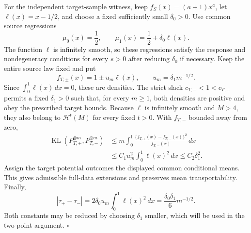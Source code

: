For the independent target-sample witness, keep \(f_S(x)=(a+1)x^a\), let \(\ell(x)=x-1/2\), and choose a fixed sufficiently small \(\delta_0>0\). Use common source regressions
\[
\mu_0(x)=\frac12,
\qquad
\mu_1(x)=\frac12+\delta_0\ell(x).
\]
The function \(\ell\) is infinitely smooth, so these regressions satisfy the response and nondegeneracy conditions for every \(s>0\) after reducing \(\delta_0\) if necessary. Keep the entire source law fixed and put
\[
f_{T,\pm}(x)=1\pm u_m\ell(x),
\qquad
u_m=\delta_1m^{-1/2}.
\]
Since \(\int_0^1\ell(x)\,dx=0\), these are densities. The strict slack \(c_{T,-}<1<c_{T,+}\) permits a fixed \(\delta_1>0\) such that, for every \(m\ge1\), both densities are positive and obey the prescribed target bounds. Because \(\ell\) is infinitely smooth and \(M>4\), they also belong to \(\mathcal H^t(M)\) for every fixed \(t>0\). With \(f_{T,-}\) bounded away from zero,
\[
\begin{aligned}
\operatorname{KL}(P_{T,+}^{\otimes m},P_{T,-}^{\otimes m})
&\le m\int_0^1
\frac{\{f_{T,+}(x)-f_{T,-}(x)\}^2}{f_{T,-}(x)}\,dx\\
&\le C_1u_m^2\int_0^1\ell(x)^2\,dx
\le C_2\delta_1^2.
\end{aligned}
\]
Assign the target potential outcomes the displayed common conditional means. This gives admissible full-data extensions and preserves mean transportability. Finally,
\[
\left|\tau_+-\tau_-\right|
=2\delta_0u_m\int_0^1\ell(x)^2\,dx
=\frac{\delta_0\delta_1}{6}m^{-1/2}.
\]
Both constants may be reduced by choosing \(\delta_1\) smaller, which will be used in the two-point argument. \(\square\)